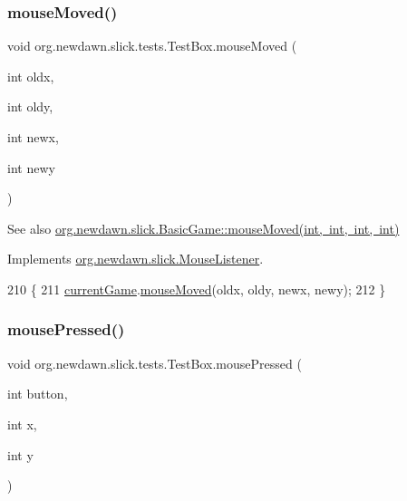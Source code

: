 \subsubsection{\texorpdfstring{mouse\+Moved()}{mouseMoved()}}
{\footnotesize\ttfamily void org.\+newdawn.\+slick.\+tests.\+Test\+Box.\+mouse\+Moved (\begin{DoxyParamCaption}\item[{int}]{oldx,  }\item[{int}]{oldy,  }\item[{int}]{newx,  }\item[{int}]{newy }\end{DoxyParamCaption})\hspace{0.3cm}{\ttfamily [inline]}}

\begin{DoxySeeAlso}{See also}
\mbox{\hyperlink{classorg_1_1newdawn_1_1slick_1_1_basic_game_adaed74556aba405022579f9369f042eb}{org.\+newdawn.\+slick.\+Basic\+Game\+::mouse\+Moved(int, int, int, int)}} 
\end{DoxySeeAlso}


Implements \mbox{\hyperlink{interfaceorg_1_1newdawn_1_1slick_1_1_mouse_listener_ad41216afc84f2c8d38f91e8b2d46bed9}{org.\+newdawn.\+slick.\+Mouse\+Listener}}.


\begin{DoxyCode}
210                                                                    \{
211         \mbox{\hyperlink{classorg_1_1newdawn_1_1slick_1_1tests_1_1_test_box_a5e0fdb2f97173d828af597044c525078}{currentGame}}.\mbox{\hyperlink{classorg_1_1newdawn_1_1slick_1_1_basic_game_adaed74556aba405022579f9369f042eb}{mouseMoved}}(oldx, oldy, newx, newy);
212     \}
\end{DoxyCode}
\mbox{\label{classorg_1_1newdawn_1_1slick_1_1tests_1_1_test_box_aa9cf4accae5a92d392913ea607398032}} 
\subsubsection{\texorpdfstring{mouse\+Pressed()}{mousePressed()}}
{\footnotesize\ttfamily void org.\+newdawn.\+slick.\+tests.\+Test\+Box.\+mouse\+Pressed (\begin{DoxyParamCaption}\item[{int}]{button,  }\item[{int}]{x,  }\item[{int}]{y }\end{DoxyParamCaption})\hspace{0.3cm}{\ttfamily [inline]}}

